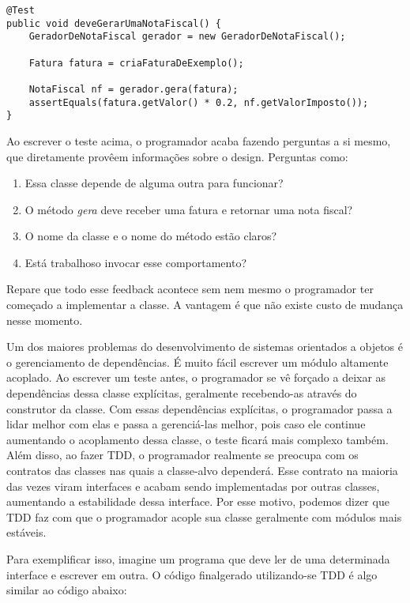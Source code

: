 \begin{lstlisting}[frame=trbl]
@Test
public void deveGerarUmaNotaFiscal() {
	GeradorDeNotaFiscal gerador = new GeradorDeNotaFiscal();
	
	Fatura fatura = criaFaturaDeExemplo();
	
	NotaFiscal nf = gerador.gera(fatura);
	assertEquals(fatura.getValor() * 0.2, nf.getValorImposto());
}
\end{lstlisting}

Ao escrever o teste acima, o programador acaba fazendo perguntas a si mesmo, que diretamente provêem informações sobre o design. Perguntas como:

\begin{enumerate}
	\item Essa classe depende de alguma outra para funcionar?
	\item O método \textit{gera} deve receber uma fatura e retornar uma nota fiscal?
	\item O nome da classe e o nome do método estão claros?
	\item Está trabalhoso invocar esse comportamento?
\end{enumerate}

Repare que todo esse feedback acontece sem nem mesmo o programador ter começado a implementar a classe. A vantagem é que
não existe custo de mudança nesse momento.

Um dos maiores problemas do desenvolvimento de sistemas orientados a objetos é o gerenciamento de dependências. É muito fácil
escrever um módulo altamente acoplado.
Ao escrever um teste antes, o programador se vê forçado a deixar as dependências dessa classe explícitas, 
geralmente recebendo-as através do construtor da classe. Com essas dependências explícitas, o programador passa a lidar 
melhor com elas e passa a gerenciá-las melhor, pois caso ele continue aumentando o acoplamento dessa classe, o teste ficará
mais complexo também. Além disso, ao fazer TDD, o programador realmente se preocupa com os contratos das classes nas quais
a classe-alvo dependerá. Esse contrato na maioria das vezes viram interfaces e acabam sendo implementadas por outras classes,
aumentando a estabilidade dessa interface. Por esse motivo, podemos dizer que TDD faz com que o programador acople sua classe
geralmente com módulos mais estáveis. 

Para exemplificar isso, imagine um programa que deve ler de uma determinada interface e escrever em outra. O código finalgerado 
utilizando-se TDD é algo similar ao código abaixo:

